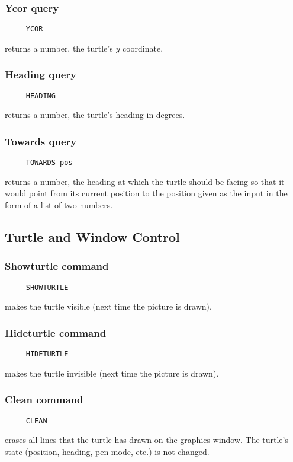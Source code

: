 \subsubsection*{Ycor query}
\begin{verbatim}
     YCOR
\end{verbatim}
returns a number, the turtle's $y$ coordinate.

\subsubsection*{Heading query}
\begin{verbatim}
     HEADING
\end{verbatim}
returns a number, the turtle's heading in degrees.

\subsubsection*{Towards query}
\begin{verbatim}
     TOWARDS pos
\end{verbatim}
returns a number, the heading at which the turtle should be facing so
that it would point from its current position to the position given as
the input in the form of a list of two numbers.


\subsection{Turtle and Window Control}
\label{logoturtle:TWC}

\subsubsection*{Showturtle command}
\begin{verbatim}
     SHOWTURTLE
\end{verbatim}
\label{logoturtle:showturtle}
makes the turtle visible (next time the picture is drawn).

\subsubsection*{Hideturtle command}
\begin{verbatim}
     HIDETURTLE
\end{verbatim}
\label{logoturtle:hideturtle}
makes the turtle invisible (next time the picture is drawn).

\subsubsection*{Clean command}
\begin{verbatim}
     CLEAN
\end{verbatim}
erases all lines that the turtle has drawn on the graphics window.
The turtle's state (position, heading, pen mode, etc.) is not changed.

